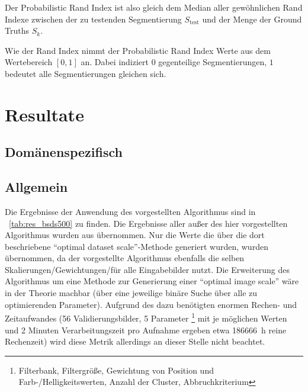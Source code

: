Der Probabilistic Rand Index ist also gleich dem Median aller gewöhnlichen Rand Indexe zwischen der zu testenden Segmentierung $S_\text{test}$ und der Menge der Ground Truths ${S_k}$.

Wie der Rand Index nimmt der Probabilistic Rand Index Werte aus dem Wertebereich $\left[0, 1\right]$ an. Dabei indiziert $0$ gegenteilige Segmentierungen, $1$ bedeutet alle Segmentierungen gleichen sich. \cite{pantofaru_07}



\section{Resultate}
\label{sec:results}

\subsection{Domänenspezifisch}

\subsection{Allgemein}

Die Ergebnisse der Anwendung des vorgestellten Algorithmus sind in \tablename~\ref{tab:res_bsds500} zu finden. Die Ergebnisse aller außer des hier vorgestellten Algorithmus wurden aus \cite{arbelaez_10} übernommen. Nur die Werte die über die dort beschriebene \enquote{optimal dataset scale}-Methode generiert wurden, wurden übernommen, da der vorgestellte Algorithmus ebenfalls die selben Skalierungen/Gewichtungen/\etc für alle Eingabebilder nutzt. Die Erweiterung des Algorithmus um eine Methode zur Generierung einer \enquote{optimal image scale} wäre in der Theorie machbar (\bspw über eine jeweilige binäre Suche über alle zu optimierenden Parameter). Aufgrund des dazu benötigten enormen Rechen- und Zeitaufwandes (56 Validierungsbilder, 5 Parameter \footnote{Filterbank, Filtergröße, Gewichtung von Position und Farb-/Helligkeitswerten, Anzahl der Cluster, Abbruchkriterium} mit je  möglichen Werten und 2 Minuten Verarbeitungszeit pro Aufnahme ergeben etwa \SI{186666}{\hour} reine Rechenzeit) wird diese Metrik allerdings an dieser Stelle nicht beachtet.

